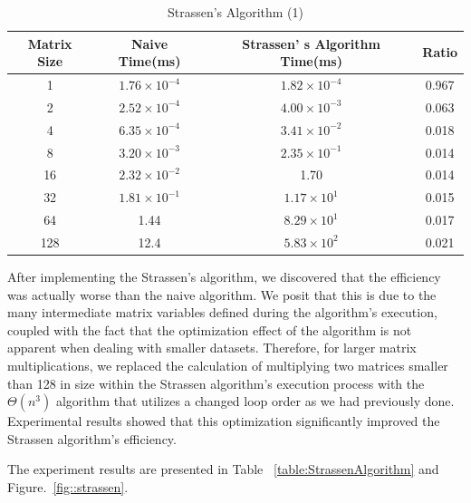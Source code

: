 \documentclass[conference]{IEEEtran}
\begin{document}
	\begin{table}[h]
		\centering
		\caption{Strassen's Algorithm (1)}
		\label{table:NaiveStrassenAlgorithm}
		\setlength\extrarowheight{2pt}
		\resizebox{0.5\textwidth}{!} {
		\begin{tabular}{|c|c|c|c|}
			\hline
			\textbf{Matrix Size} & \textbf{Naive Time(ms)} & \textbf{Strassen' s Algorithm Time(ms)} & \textbf{Ratio} \\ \hline
			1 & $1.76 \times 10^{-4}$ & $1.82 \times 10^{-4}$ & 0.967 \\
			2 & $2.52\times 10^{-4}$ & $4.00 \times 10^{-3}$ & 0.063 \\
			4 & $6.35 \times 10^{-4}$ & $3.41\times 10^{-2}$ & 0.018 \\
			8 & $3.20 \times 10^{-3}$ & $2.35 \times 10^{-1}$ & 0.014 \\
			16 & $2.32 \times 10^{-2}$ & 1.70 & 0.014 \\
			32 & $1.81 \times 10^{-1}$ & $1.17 \times 10^{1}$ & 0.015 \\
			64 & 1.44 & $8.29 \times 10^{1}$ & 0.017 \\
			128 & 12.4 & $5.83 \times 10^2$ & 0.021 \\ \hline
		\end{tabular}
	}
	\end{table}
	
	After implementing the Strassen's algorithm, we discovered that the efficiency was actually worse than the naive algorithm. We posit that this is due to the many intermediate matrix variables defined during the algorithm's execution, coupled with the fact that the optimization effect of the algorithm is not apparent when dealing with smaller datasets. Therefore, for larger matrix multiplications, we replaced the calculation of multiplying two matrices smaller than 128 in size within the Strassen algorithm's execution process with the $\Theta(n^3)$ algorithm that utilizes a changed loop order as we had previously done. Experimental results showed that this optimization significantly improved the Strassen algorithm's efficiency.
	
	The experiment results are presented in Table ~\ref{table:StrassenAlgorithm} and Figure.~\ref{fig::strassen}.
	
\end{document}

